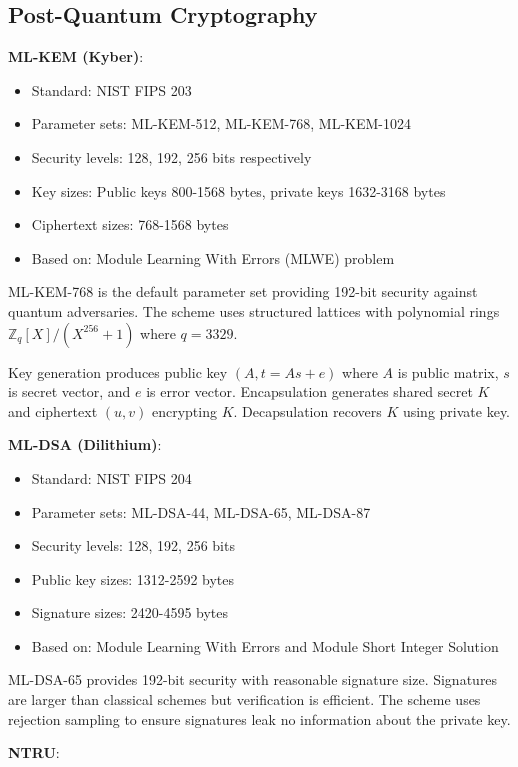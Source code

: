 \subsection{Post-Quantum Cryptography}

\textbf{ML-KEM (Kyber)}:

\begin{itemize}
\item Standard: NIST FIPS 203
\item Parameter sets: ML-KEM-512, ML-KEM-768, ML-KEM-1024
\item Security levels: 128, 192, 256 bits respectively
\item Key sizes: Public keys 800-1568 bytes, private keys 1632-3168
  bytes
\item Ciphertext sizes: 768-1568 bytes
\item Based on: Module Learning With Errors (MLWE) problem
\end{itemize}

ML-KEM-768 is the default parameter set providing 192-bit security
against quantum adversaries. The scheme uses structured lattices with
polynomial rings $\mathbb{Z}_q[X]/(X^{256} + 1)$ where $q = 3329$.

Key generation produces public key $(A, t = As + e)$ where $A$ is
public matrix, $s$ is secret vector, and $e$ is error
vector. Encapsulation generates shared secret $K$ and ciphertext $(u,
v)$ encrypting $K$. Decapsulation recovers $K$ using private key.

\textbf{ML-DSA (Dilithium)}:

\begin{itemize}
\item Standard: NIST FIPS 204
\item Parameter sets: ML-DSA-44, ML-DSA-65, ML-DSA-87
\item Security levels: 128, 192, 256 bits
\item Public key sizes: 1312-2592 bytes
\item Signature sizes: 2420-4595 bytes
\item Based on: Module Learning With Errors and Module Short Integer
  Solution
\end{itemize}

ML-DSA-65 provides 192-bit security with reasonable signature
size. Signatures are larger than classical schemes but verification is
efficient. The scheme uses rejection sampling to ensure signatures
leak no information about the private key.

\textbf{NTRU}:

